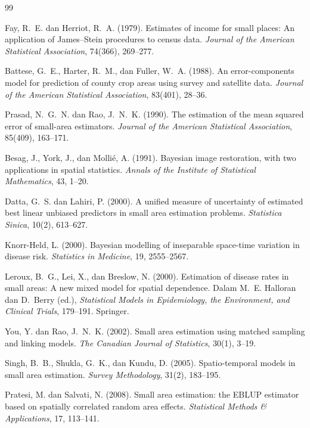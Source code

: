 \documentclass[11pt,a4paper]{article}
\theoremstyle{definition}
\begin{document}
\begin{thebibliography}{99}

Fay, R.~E. dan Herriot, R.~A. (1979).
Estimates of income for small places: An application of James--Stein procedures
to census data.
\emph{Journal of the American Statistical Association}, 74(366), 269--277.

Battese, G.~E., Harter, R.~M., dan Fuller, W.~A. (1988).
An error-components model for prediction of county crop areas using survey and
satellite data.
\emph{Journal of the American Statistical Association}, 83(401), 28--36.

Prasad, N.~G.~N. dan Rao, J.~N.~K. (1990).
The estimation of the mean squared error of small-area estimators.
\emph{Journal of the American Statistical Association}, 85(409), 163--171.

Besag, J., York, J., dan Molli\'e, A. (1991).
Bayesian image restoration, with two applications in spatial statistics.
\emph{Annals of the Institute of Statistical Mathematics}, 43, 1--20.

Datta, G.~S. dan Lahiri, P. (2000).
A unified measure of uncertainty of estimated best linear unbiased predictors
in small area estimation problems.
\emph{Statistica Sinica}, 10(2), 613--627.

Knorr-Held, L. (2000).
Bayesian modelling of inseparable space-time variation in disease risk.
\emph{Statistics in Medicine}, 19, 2555--2567.

Leroux, B.~G., Lei, X., dan Breslow, N. (2000).
Estimation of disease rates in small areas: A new mixed model for spatial
dependence.
Dalam M.~E. Halloran dan D.~Berry (ed.), \emph{Statistical Models in
Epidemiology, the Environment, and Clinical Trials}, 179--191. Springer.

You, Y. dan Rao, J.~N.~K. (2002).
Small area estimation using matched sampling and linking models.
\emph{The Canadian Journal of Statistics}, 30(1), 3--19.

Singh, B.~B., Shukla, G.~K., dan Kundu, D. (2005).
Spatio-temporal models in small area estimation.
\emph{Survey Methodology}, 31(2), 183--195.

Pratesi, M. dan Salvati, N. (2008).
Small area estimation: the EBLUP estimator based on spatially correlated random
area effects.
\emph{Statistical Methods \& Applications}, 17, 113--141.


\end{thebibliography}
\end{document}
